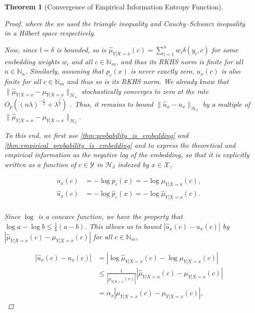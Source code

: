 \documentclass{article}
\newtheorem{theorem}{Theorem}[section]
\begin{document}
\begin{theorem}[Convergence of Empirical Information Entropy Function]
\begin{proof}
				where the we used the triangle inequality and Cauchy–Schwarz inequality in a Hilbert space respectively.
				
				Now, since $l = \delta$ is bounded, so is $\hat{\mu}_{Y | X = x}(c) = \sum_{i = 1}^{n} w_{i} \delta(y_{i}, c)$ for some embedding weights $w_{i}$ and all $c \in \mathbb{N}_{m}$, and thus its RKHS norm is finite for all $n \in \mathbb{N}_{n}$. Similarly, assuming that $p_{c}(x)$ is never exactly zero, $u_{x}(c)$ is also finite for all $c \in \mathbb{N}_{m}$ and thus so is its RKHS norm. We already know that $\| \hat{\mu}_{Y | X = x} - \mu_{Y | X = x} \|_{\mathcal{H}_{\delta}}$ stochastically converges to zero at the rate $O_{p}((n \lambda)^{-\frac{1}{2}} + \lambda^{\frac{1}{2}})$ \citep[Theorem 6]{song2009hilbert}. Thus, it remains to bound $\| \hat{u}_{x} - u_{x} \|_{\mathcal{H}_{\delta}}$ by a multiple of $\| \hat{\mu}_{Y | X = x} - \mu_{Y | X = x} \|_{\mathcal{H}_{\delta}}$.
				
				To this end, we first use \cref{thm:probability_is_embedding} and \cref{thm:empirical_probability_is_embedding} and to express the theoretical and empirical information as the negative log of the embedding, so that it is explicitly written as a function of $c \in \mathcal{Y}$ in $\mathcal{H}_{\delta}$ indexed by $x \in \mathcal{X}$,
				
				\begin{equation}
				\begin{aligned}
					u_{x}(c) &= - \log{p_{c}(x)} = -\log{\mu_{Y | X = x}(c)}, \\
					\hat{u}_{x}(c) &= - \log{\hat{p}_{c}(x)} = -\log{\hat{\mu}_{Y | X = x}(c)}. \\
				\end{aligned}
				\end{equation}
				
				Since $\log$ is a concave function, we have the property that $\log{a} - \log{b} \leq \frac{1}{b} (a - b)$. This allows us to bound $| \hat{u}_{x}(c) - u_{x}(c) |$ by $| \hat{\mu}_{Y | X = x}(c) - \mu_{Y | X = x}(c) |$ for all $c \in \mathbb{N}_{m}$,
				
				\begin{equation}
				\begin{aligned}
					| \hat{u}_{x}(c) - u_{x}(c) | &= | \log{\hat{\mu}_{Y | X = x}(c)} - \log{\mu_{Y | X = x}(c)} | \\
					&\leq \frac{1}{| \mu_{Y | X = x}(c) |} | \hat{\mu}_{Y | X = x}(c) - \mu_{Y | X = x}(c) | \\
					&= \alpha_{x} | \hat{\mu}_{Y | X = x}(c) - \mu_{Y | X = x}(c) |,
				\end{aligned}
				\end{equation}
				

\end{proof}
\end{theorem}
\end{document}
